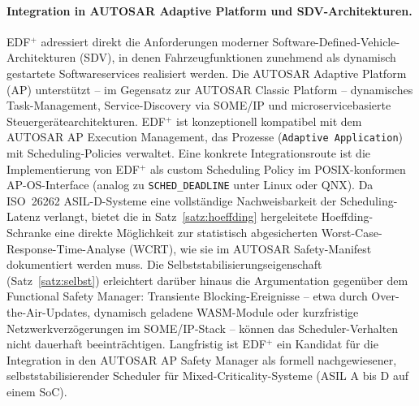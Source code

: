 ﻿\documentclass[a4paper,12pt]{article}
\theoremstyle{definition}
\begin{document}
	\paragraph{Integration in AUTOSAR Adaptive Platform und SDV-Architekturen.}
	EDF$^+$ adressiert direkt die Anforderungen moderner Software-Defined-Vehicle-Architekturen
	(SDV), in denen Fahrzeugfunktionen zunehmend als dynamisch gestartete Softwareservices
	realisiert werden. Die AUTOSAR Adaptive Platform (AP) unterstützt -- im Gegensatz zur
	AUTOSAR Classic Platform -- dynamisches Task-Management, Service-Discovery via SOME/IP
	und microservicebasierte Steuergerätearchitekturen. EDF$^+$ ist konzeptionell kompatibel
	mit dem AUTOSAR AP Execution Management, das Prozesse (\texttt{Adaptive Application})
	mit Scheduling-Policies verwaltet. Eine konkrete Integrationsroute ist die Implementierung
	von EDF$^+$ als custom Scheduling Policy im POSIX-konformen AP-OS-Interface
	(analog zu \texttt{SCHED\_DEADLINE} unter Linux oder QNX).
	Da ISO~26262 ASIL-D-Systeme eine vollständige Nachweisbarkeit der Scheduling-Latenz
	verlangt, bietet die in Satz~\ref{satz:hoeffding} hergeleitete Hoeffding-Schranke eine
	direkte Möglichkeit zur statistisch abgesicherten Worst-Case-Response-Time-Analyse
	(WCRT), wie sie im AUTOSAR Safety-Manifest dokumentiert werden muss.
	Die Selbststabilisierungseigenschaft (Satz~\ref{satz:selbst}) erleichtert darüber hinaus
	die Argumentation gegenüber dem Functional Safety Manager: Transiente Blocking-Ereignisse
	-- etwa durch Over-the-Air-Updates, dynamisch geladene WASM-Module oder kurzfristige
	Netzwerkverzögerungen im SOME/IP-Stack -- können das Scheduler-Verhalten nicht dauerhaft
	beeinträchtigen. Langfristig ist EDF$^+$ ein Kandidat für
	die Integration in den AUTOSAR AP Safety Manager als formell nachgewiesener, selbst\-stabilisierender Scheduler
	für Mixed-Criticality-Systeme (ASIL A bis D auf einem SoC).
\end{document}
